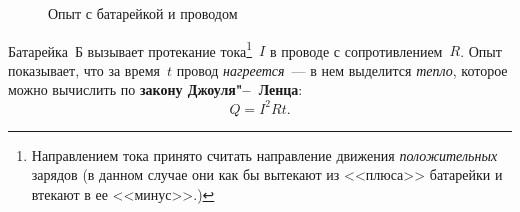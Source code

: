\documentclass[main.tex]{subfiles}
\begin{document}
\begin{figure}[H]
\begin{circuitikz}[font=\small,thin,
    line cap=round,line join=round,
>={Stealth[inset=0pt,round,length=3mm, angle'=20]},
vec/.style={>={Stealth[inset=0pt,round,length=3.5mm, angle'=20]}}]



\end{circuitikz}
\caption{Опыт с батарейкой и проводом}
\label{fig:p125}
\end{figure}

Батарейка~Б вызывает протекание тока\footnote{Направлением тока принято считать направление движения \emph{положительных} зарядов (в данном случае они как бы вытекают из <<плюса>> батарейки и втекают в ее <<минус>>.)
}~$I$ в проводе с сопротивлением~$R$. Опыт показывает, что за время~$t$ провод \emph{нагреется}~--- в нем выделится \emph{тепло}, которое можно вычислить по \textbf{закону Джоуля"--~Ленца}:
\begin{equation}
    Q=I^2Rt.
\end{equation}







 
\end{document}
